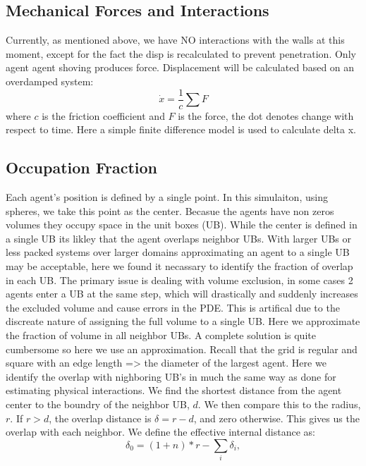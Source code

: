 \documentclass{article}
\begin{document}
\subsection{Mechanical Forces and Interactions}
Currently, as mentioned above, 
we have NO interactions with the walls at this moment,
except for the fact the disp is recalculated to prevent penetration.
Only agent agent shoving produces force.
Displacement will be calculated based on an overdamped system:
\begin{equation}
\dot{x} = \frac{1}{c} \sum F
\label{EQ:disp}
\end{equation}
where $c$ is the friction coefficient and $F$ is the force, the dot denotes change with respect to time.
Here a simple finite difference model is used to calculate delta x.

\subsection{Occupation Fraction}
Each agent's position is defined by a single point.  
In this simulaiton, using spheres, we take this point as the center.
Becasue the agents have non zeros volumes they occupy space in the unit boxes (UB).
While the center is defined in a single UB its likley that the agent overlaps neighbor UBs.
With larger UBs or less packed systems over larger domains approximating an agent to a single UB may be acceptable,
here we found it necassary to identify the fraction of overlap in each UB.
The primary issue is dealing with volume exclusion,
in some cases 2 agents enter a UB at the same step, 
which will drastically and suddenly increases the excluded volume and cause errors in the PDE.
This is artifical due to the discreate nature of assigning the full volume to a single UB.
Here we approximate the fraction of volume in all neighbor UBs.
A complete solution is quite cumbersome so here we use an approximation.
Recall that the grid is regular and square with an edge length => the diameter of the largest agent.
Here we identify the overlap with nighboring UB's in much the same way as done for estimating physical interactions.
We find the shortest distance from the agent center to the boundry of the neighbor UB, $d$.
We then compare this to the radius, $r$.
If $r>d$, the overlap distance is $\delta = r-d$, and zero otherwise.
This gives us the overlap with each neighbor.  
We define the effective internal distance as:
\begin{equation}
\delta_0 = (1+n)*r - \sum_i \delta_i,
\end{equation}
\end{document}
